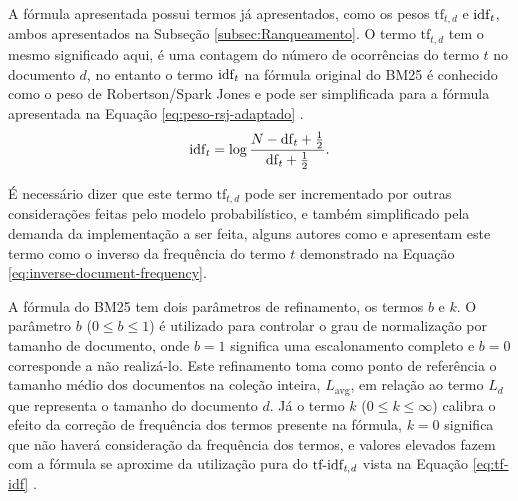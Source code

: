     A fórmula apresentada possui termos já apresentados, como os pesos $\text{tf}_{t,d}$ e $\text{idf}_{\text{\textit{t}}}$, ambos apresentados na Subseção \ref{subsec:Ranqueamento}.
    O termo $\text{tf}_{t,d}$ tem o mesmo significado aqui, é uma contagem do número de ocorrências do termo $t$ no documento $d$, no entanto o termo $\text{idf}_{\text{\textit{t}}}$ na fórmula original do BM25 é conhecido como o peso de Robertson/Spark Jones e pode ser simplificada para a fórmula apresentada na Equação \ref{eq:peso-rsj-adaptado} \cite[p.~347--349]{robertson_probabilistic_2010}.
    \begin{equation}
        \label{eq:peso-rsj-adaptado}
		\text{idf}_{\text{\textit{t}}} = \log{\frac{N-\text{df}_{\text{\textit{t}}}+\frac{1}{2}}{\text{df}_{\text{\textit{t}}} + \frac{1}{2} }}.
    \end{equation}
    
    É necessário dizer que este termo $\text{tf}_{t,d}$ pode ser incrementado por outras considerações feitas pelo modelo probabilístico, e também simplificado pela demanda da implementação a ser feita, alguns autores como  e  apresentam este termo como o inverso da frequência do termo $t$ demonstrado na Equação \ref{eq:inverse-document-frequency}.
    
    A fórmula do BM25 tem dois parâmetros de refinamento, os termos $b$ e $k$. 
    O parâmetro $b$ ($0 \leq b \leq 1$) é utilizado para controlar o grau de normalização por tamanho de documento, onde $b=1$ significa uma escalonamento completo e $b=0$ corresponde a não realizá-lo. 
    Este refinamento toma como ponto de referência o tamanho médio dos documentos na coleção inteira, $L_{\text{avg}}$, em relação ao termo $L_d$ que representa o tamanho do documento $d$.
    Já o termo $k$ ($0 \leq k \leq \infty$) calibra o efeito da correção de frequência dos termos presente na fórmula, $k=0$ significa que não haverá consideração da frequência dos termos, e valores elevados fazem com a fórmula se aproxime da utilização pura do $\text{tf-idf}_{\text{\textit{t},\textit{d}}}$ vista na Equação \ref{eq:tf-idf} \cite[p.~214]{Manning2008IIR}.

